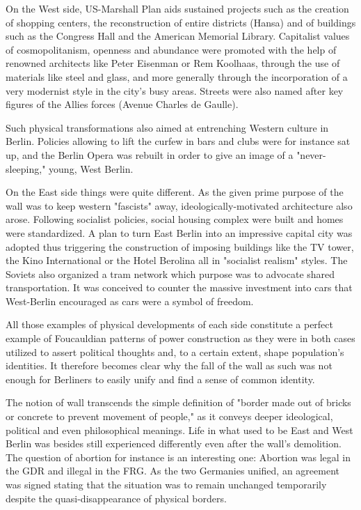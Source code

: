    On the West side, US-Marshall Plan aids sustained projects such as the
   creation of shopping centers, the reconstruction of entire districts
   (Hansa) and of buildings such as the Congress Hall and the American
   Memorial Library. Capitalist values of cosmopolitanism, openness and
   abundance were promoted with the help of renowned architects like Peter
   Eisenman or Rem Koolhaas, through the use of materials like steel and
   glass, and more generally through the incorporation of a very modernist
   style in the city's busy areas. Streets were also named after key
   figures of the Allies forces (Avenue Charles de Gaulle).

   Such physical transformations also aimed at entrenching Western culture
   in Berlin. Policies allowing to lift the curfew in bars and clubs were
   for instance sat up, and the Berlin Opera was rebuilt in order to give
   an image of a "never-sleeping," young, West Berlin.

   On the East side things were quite different. As the given prime
   purpose of the wall was to keep western "fascists" away,
   ideologically-motivated architecture also arose. Following socialist
   policies, social housing complex were built and homes were
   standardized. A plan to turn East Berlin into an impressive capital
   city was adopted thus triggering the construction of imposing buildings
   like the TV tower, the Kino International or the Hotel Berolina all in
   "socialist realism" styles. The Soviets also organized a tram network
   which purpose was to advocate shared transportation. It was conceived
   to counter the massive investment into cars that West-Berlin encouraged
   as cars were a symbol of freedom.

   All those examples of physical developments of each side constitute a
   perfect example of Foucauldian patterns of power construction as they
   were in both cases utilized to assert political thoughts and, to a
   certain extent, shape population's identities. It therefore becomes
   clear why the fall of the wall as such was not enough for Berliners to
   easily unify and find a sense of common identity.

   The notion of wall transcends the simple definition of "border made out
   of bricks or concrete to prevent movement of people," as it conveys
   deeper ideological, political and even philosophical meanings. Life in
   what used to be East and West Berlin was besides still experienced
   differently even after the wall's demolition. The question of abortion
   for instance is an interesting one: Abortion was legal in the GDR and
   illegal in the FRG. As the two Germanies unified, an agreement was
   signed stating that the situation was to remain unchanged temporarily
   despite the quasi-disappearance of physical borders.

